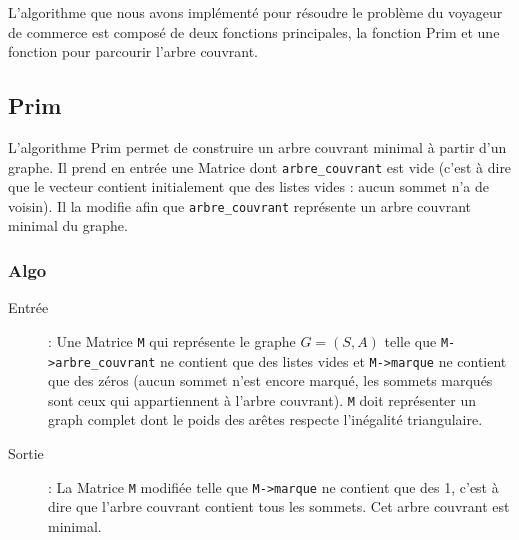\documentclass[a4paper,11pt]{article}
\begin{document}
L'algorithme que nous avons implémenté pour résoudre le problème du voyageur de commerce est composé de deux fonctions principales, la fonction Prim et une fonction pour parcourir l'arbre couvrant.\\

\subsection{Prim} %

L'algorithme Prim permet de construire un arbre couvrant minimal à partir d'un graphe. Il prend en entrée une \textsf{Matrice} dont \texttt{arbre\_couvrant} est vide (c'est à dire que le vecteur contient initialement que des listes vides : aucun sommet n'a de voisin). Il la modifie afin que \texttt{arbre\_couvrant} représente un arbre couvrant minimal du graphe.\\

\subsubsection*{Algo}
\begin{description}
\item[Entrée] : Une Matrice \texttt{M} qui représente le graphe $G = (S, A)$ telle que \texttt{M->arbre\_couvrant} ne contient que des listes vides et \texttt{M->marque} ne contient que des zéros (aucun sommet n'est encore marqué, les sommets marqués sont ceux qui appartiennent à l'arbre couvrant). \texttt{M} doit représenter un graph complet dont le poids des arêtes respecte l'inégalité triangulaire.
\item[Sortie] : La Matrice \texttt{M} modifiée telle que \texttt{M->marque} ne contient que des 1, c'est à dire que l'arbre couvrant contient tous les sommets. Cet arbre couvrant est minimal.
\end{description}
\end{document}
